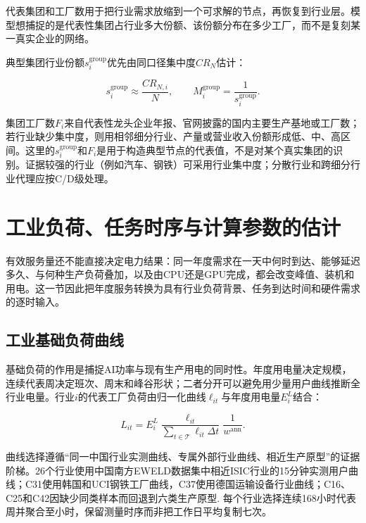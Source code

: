 \documentclass[preprint]{elsarticle}
\begin{document}
代表集团和工厂数用于把行业需求放缩到一个可求解的节点，再恢复到行业层。模型想捕捉的是代表性集团占行业多大份额、该份额分布在多少工厂，而不是复刻某一真实企业的网络。

典型集团行业份额$s_i^{\mathrm{group}}$优先由同口径集中度$CR_N$估计：

\begin{equation}
 s_i^{\mathrm{group}}\approx\frac{CR_{N,i}}{N},
 \qquad M_i^{\mathrm{group}}=\frac{1}{s_i^{\mathrm{group}}}.
 \label{eq:group-share-estimation}
\end{equation}

集团工厂数$F_i$来自代表性龙头企业年报、官网披露的国内主要生产基地或工厂数；若行业缺少集中度，则用相邻细分行业、产量或营业收入份额形成低、中、高区间。这里的$s_i^{\mathrm{group}}$和$F_i$是用于构造典型节点的代表值，不是对某个真实集团的识别。证据较强的行业（例如汽车、钢铁）可采用行业集中度；分散行业和跨细分行业代理应按C/D级处理。

\section{工业负荷、任务时序与计算参数的估计}

有效服务量还不能直接决定电力结果：同一年度需求在一天中何时到达、能够延迟多久、与何种生产负荷叠加，以及由CPU还是GPU完成，都会改变峰值、装机和用电。这一节因此把年度服务转换为具有行业负荷背景、任务到达时间和硬件需求的逐时输入。

\subsection{工业基础负荷曲线}

基础负荷的作用是捕捉AI功率与现有生产用电的同时性。年度用电量决定规模，连续代表周决定班次、周末和峰谷形状；二者分开可以避免用少量用户曲线推断全行业电量。行业$i$的代表工厂负荷由归一化曲线$\ell_{it}$与年度用电量$E_i^{L}$结合：

\begin{equation}
 L_{it}=E_i^{L}\frac{\ell_{it}}{\sum_{t\in\mathcal T}\ell_{it}\Delta t}\frac{1}{w^{\mathrm{ann}}}.
 \label{eq:base-load-scaling}
\end{equation}

曲线选择遵循“同一中国行业实测曲线、专属外部行业曲线、相近生产原型”的证据阶梯。26个行业使用中国南方EWELD数据集中相近ISIC行业的15分钟实测用户曲线；C31使用韩国和UCI钢铁工厂曲线，C37使用德国运输设备行业曲线；C16、C25和C42因缺少同类样本而回退到六类生产原型\cite{eweld2023,uciSteel,ffeLoad}. 每个行业选择连续168小时代表周并聚合至小时，保留测量时序而非把工作日平均复制七次。
\end{document}
